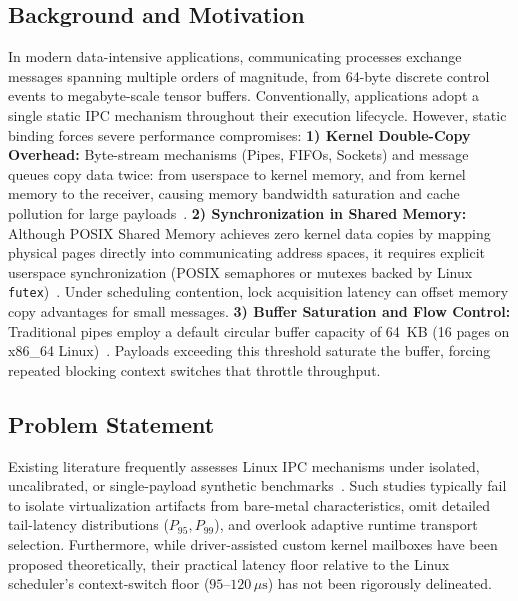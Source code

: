\subsection{Background and Motivation}
In modern data-intensive applications, communicating processes exchange messages spanning multiple orders of magnitude, from 64-byte discrete control events to megabyte-scale tensor buffers. Conventionally, applications adopt a single static IPC mechanism throughout their execution lifecycle. However, static binding forces severe performance compromises:
\textbf{1) Kernel Double-Copy Overhead:} Byte-stream mechanisms (Pipes, FIFOs, Sockets) and message queues copy data twice: from userspace to kernel memory, and from kernel memory to the receiver, causing memory bandwidth saturation and cache pollution for large payloads~\cite{drepper2007every}.
\textbf{2) Synchronization in Shared Memory:} Although POSIX Shared Memory achieves zero kernel data copies by mapping physical pages directly into communicating address spaces, it requires explicit userspace synchronization (POSIX semaphores or mutexes backed by Linux \texttt{futex})~\cite{franke2002futex}. Under scheduling contention, lock acquisition latency can offset memory copy advantages for small messages.
\textbf{3) Buffer Saturation and Flow Control:} Traditional pipes employ a default circular buffer capacity of 64~KB (16 pages on x86\_64 Linux)~\cite{bovet2005understanding}. Payloads exceeding this threshold saturate the buffer, forcing repeated blocking context switches that throttle throughput.

\subsection{Problem Statement}
Existing literature frequently assesses Linux IPC mechanisms under isolated, uncalibrated, or single-payload synthetic benchmarks~\cite{danyliuk2026classical}. Such studies typically fail to isolate virtualization artifacts from bare-metal characteristics, omit detailed tail-latency distributions ($P_{95}, P_{99}$), and overlook adaptive runtime transport selection. Furthermore, while driver-assisted custom kernel mailboxes have been proposed theoretically, their practical latency floor relative to the Linux scheduler's context-switch floor ($95\text{--}120\,\mu\text{s}$) has not been rigorously delineated.

